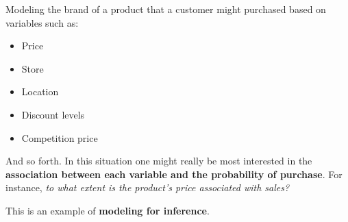\documentclass[a4paper]{article}
\begin{document}
    \begin{examplebox}
        Modeling the brand of a product that a customer might purchased based on variables such as:
            \begin{itemize}
                \item Price
                \item Store
                \item Location
                \item Discount levels
                \item Competition price
            \end{itemize}
        And so forth. In this situation one might really be most interested in the \textbf{association between each variable and the probability of purchase}. For instance, \emph{to what extent is the product's price associated with sales?}

        This is an example of \textbf{modeling for inference}.
    \end{examplebox}
\end{document}
